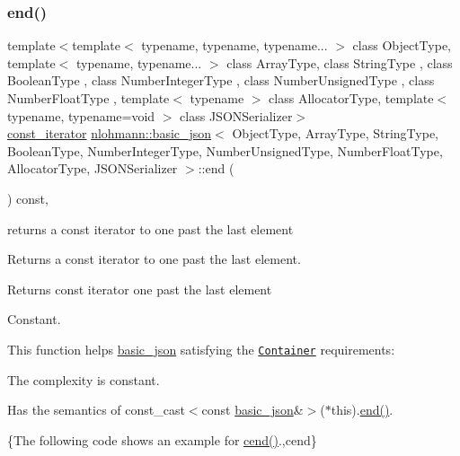 \subsubsection{\texorpdfstring{end()}{end()}\hspace{0.1cm}{\footnotesize\ttfamily [2/2]}}
{\footnotesize\ttfamily template$<$template$<$ typename, typename, typename... $>$ class Object\+Type, template$<$ typename, typename... $>$ class Array\+Type, class String\+Type , class Boolean\+Type , class Number\+Integer\+Type , class Number\+Unsigned\+Type , class Number\+Float\+Type , template$<$ typename $>$ class Allocator\+Type, template$<$ typename, typename=void $>$ class J\+S\+O\+N\+Serializer$>$ \\
\hyperlink{classnlohmann_1_1basic__json_a41a70cf9993951836d129bb1c2b3126a}{const\+\_\+iterator} \hyperlink{classnlohmann_1_1basic__json}{nlohmann\+::basic\+\_\+json}$<$ Object\+Type, Array\+Type, String\+Type, Boolean\+Type, Number\+Integer\+Type, Number\+Unsigned\+Type, Number\+Float\+Type, Allocator\+Type, J\+S\+O\+N\+Serializer $>$\+::end (\begin{DoxyParamCaption}{ }\end{DoxyParamCaption}) const\hspace{0.3cm}{\ttfamily [inline]}, {\ttfamily [noexcept]}}



returns a const iterator to one past the last element 

Returns a const iterator to one past the last element.

 \begin{DoxyReturn}{Returns}
const iterator one past the last element
\end{DoxyReturn}
Constant.

This function helps {\ttfamily \hyperlink{classnlohmann_1_1basic__json}{basic\+\_\+json}} satisfying the \href{http://en.cppreference.com/w/cpp/concept/Container}{\tt Container} requirements\+:
\begin{DoxyItemize}
\item The complexity is constant.
\item Has the semantics of {\ttfamily const\+\_\+cast$<$const \hyperlink{classnlohmann_1_1basic__json}{basic\+\_\+json}\&$>$($\ast$this).\hyperlink{classnlohmann_1_1basic__json_a13e032a02a7fd8a93fdddc2fcbc4763c}{end()}}.
\end{DoxyItemize}

\{The following code shows an example for {\ttfamily \hyperlink{classnlohmann_1_1basic__json_a8dba7b7d2f38e6b0c614030aa43983f6}{cend()}}.,cend\}


